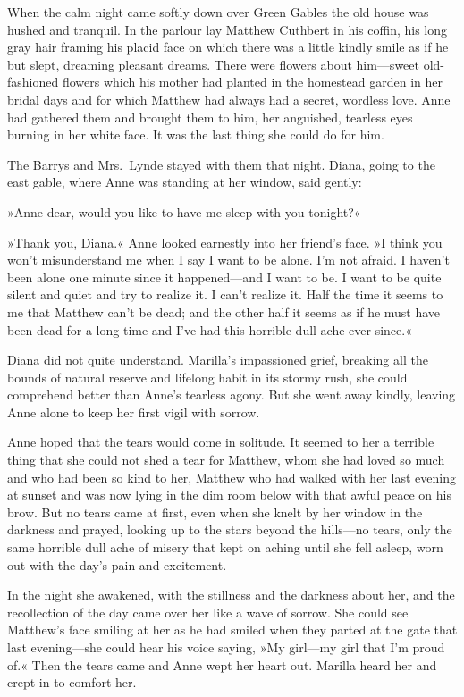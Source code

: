 When the calm night came softly down over Green Gables the old house was hushed and tranquil. In the parlour lay Matthew Cuthbert in his coffin, his long gray hair framing his placid face on which there was a little kindly smile as if he but slept, dreaming pleasant dreams. There were flowers about him—sweet old-fashioned flowers which his mother had planted in the homestead garden in her bridal days and for which Matthew had always had a secret, wordless love. Anne had gathered them and brought them to him, her anguished, tearless eyes burning in her white face. It was the last thing she could do for him.

The Barrys and Mrs.~Lynde stayed with them that night. Diana, going to the east gable, where Anne was standing at her window, said gently:

»Anne dear, would you like to have me sleep with you tonight?«

»Thank you, Diana.« Anne looked earnestly into her friend's face. »I think you won't misunderstand me when I say I want to be alone. I'm not afraid. I haven't been alone one minute since it happened—and I want to be. I want to be quite silent and quiet and try to realize it. I can't realize it. Half the time it seems to me that Matthew can't be dead; and the other half it seems as if he must have been dead for a long time and I've had this horrible dull ache ever since.«

Diana did not quite understand. Marilla's impassioned grief, breaking all the bounds of natural reserve and lifelong habit in its stormy rush, she could comprehend better than Anne's tearless agony. But she went away kindly, leaving Anne alone to keep her first vigil with sorrow.

Anne hoped that the tears would come in solitude. It seemed to her a terrible thing that she could not shed a tear for Matthew, whom she had loved so much and who had been so kind to her, Matthew who had walked with her last evening at sunset and was now lying in the dim room below with that awful peace on his brow. But no tears came at first, even when she knelt by her window in the darkness and prayed, looking up to the stars beyond the hills—no tears, only the same horrible dull ache of misery that kept on aching until she fell asleep, worn out with the day's pain and excitement.

In the night she awakened, with the stillness and the darkness about her, and the recollection of the day came over her like a wave of sorrow. She could see Matthew's face smiling at her as he had smiled when they parted at the gate that last evening—she could hear his voice saying, »My girl—my girl that I'm proud of.« Then the tears came and Anne wept her heart out. Marilla heard her and crept in to comfort her.

